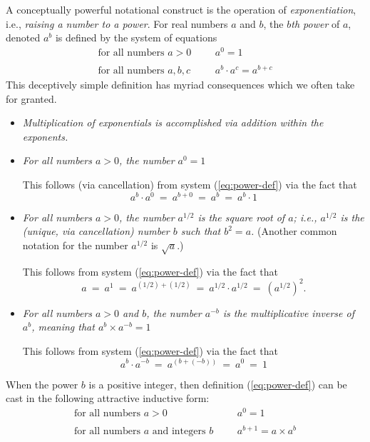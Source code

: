 A conceptually powerful notational construct is the operation of {\it
  exponentiation}, 
i.e., {\it raising a number to a power}.
For real numbers $a$ and $b$, the {\it $b$th power} of $a$, denoted
$a^b$ is defined by the system of equations
\begin{equation}
\label{eq:power-def}
\begin{array}{llll}
\mbox{for all numbers $a>0$} & & & a^0 = 1 \\
 & & & \\
\mbox{for all numbers $a, b, c$} & & & a^b \cdot a^c = a^{b+c}
\end{array}
\end{equation}
This deceptively simple definition has myriad consequences which we
often take for granted.
\begin{itemize}
\item
{\em Multiplication of exponentials is accomplished via addition
  within the exponents.}

\item
{\em For all numbers $a>0$, the number $a^0 = 1$}

This follows (via cancellation) from system (\ref{eq:power-def}) via
the fact that
\[ a^b \cdot a^0 \ = \ a^{b+0} \ = \ a^b \ = \ a^b \cdot 1  \]

\item
{\em For all numbers $a >0$, the number $a^{1/2}$
is the {\it square root} of $a$; i.e., $a^{1/2}$ is
the (unique, via cancellation) number $b$ such that $b^2 = a$.}
(Another common notation for the number $a^{1/2}$ is
$\sqrt{a}$.)

This follows from system (\ref{eq:power-def}) via the fact that
\[ a \ = \ a^1 \ = \ a^{(1/2) + (1/2)} \ = \ a^{1/2} \cdot a^{1/2} \ = \
\left(a^{1/2}\right)^2. \]

\item
{\em For all numbers $a>0$ and $b$, the number $a^{-b}$ is the {\it
    multiplicative inverse} of $a^b$, meaning that $a^b \times a^{-b}
  = 1$}

This follows from system (\ref{eq:power-def}) via the fact that
\[ a^b \cdot a^{-b} \ = \ a^{(b + (-b))} \ = \ a^0 \ = \  1 \]
\end{itemize}
When the power $b$ is a positive integer, then definition
(\ref{eq:power-def}) can be cast in the following attractive inductive
form:
\begin{equation}
\label{eq:power-def-integer}
\begin{array}{llll}
\mbox{for all numbers $a>0$} & & & a^0 = 1 \\
 & & & \\
\mbox{for all numbers $a$ and integers $b$} & & & a^{b+1} = a \times
a^b
\end{array}
\end{equation}

